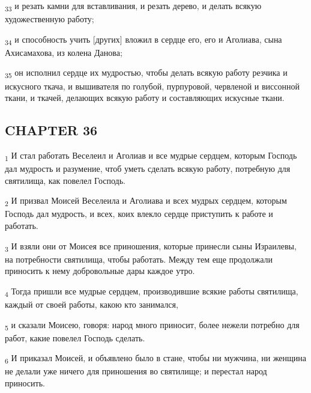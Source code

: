 \begin{tcolorbox}
\textsubscript{33} и резать камни для вставливания, и резать дерево, и делать всякую художественную работу;
\end{tcolorbox}
\begin{tcolorbox}
\textsubscript{34} и способность учить [других] вложил в сердце его, его и Аголиава, сына Ахисамахова, из колена Данова;
\end{tcolorbox}
\begin{tcolorbox}
\textsubscript{35} он исполнил сердце их мудростью, чтобы делать всякую работу резчика и искусного ткача, и вышивателя по голубой, пурпуровой, червленой и виссонной ткани, и ткачей, делающих всякую работу и составляющих искусные ткани.
\end{tcolorbox}
\subsection{CHAPTER 36}
\begin{tcolorbox}
\textsubscript{1} И стал работать Веселеил и Аголиав и все мудрые сердцем, которым Господь дал мудрость и разумение, чтоб уметь сделать всякую работу, потребную для святилища, как повелел Господь.
\end{tcolorbox}
\begin{tcolorbox}
\textsubscript{2} И призвал Моисей Веселеила и Аголиава и всех мудрых сердцем, которым Господь дал мудрость, и всех, коих влекло сердце приступить к работе и работать.
\end{tcolorbox}
\begin{tcolorbox}
\textsubscript{3} И взяли они от Моисея все приношения, которые принесли сыны Израилевы, на потребности святилища, чтобы работать. Между тем еще продолжали приносить к нему добровольные дары каждое утро.
\end{tcolorbox}
\begin{tcolorbox}
\textsubscript{4} Тогда пришли все мудрые сердцем, производившие всякие работы святилища, каждый от своей работы, какою кто занимался,
\end{tcolorbox}
\begin{tcolorbox}
\textsubscript{5} и сказали Моисею, говоря: народ много приносит, более нежели потребно для работ, какие повелел Господь сделать.
\end{tcolorbox}
\begin{tcolorbox}
\textsubscript{6} И приказал Моисей, и объявлено было в стане, чтобы ни мужчина, ни женщина не делали уже ничего для приношения во святилище; и перестал народ приносить.
\end{tcolorbox}
